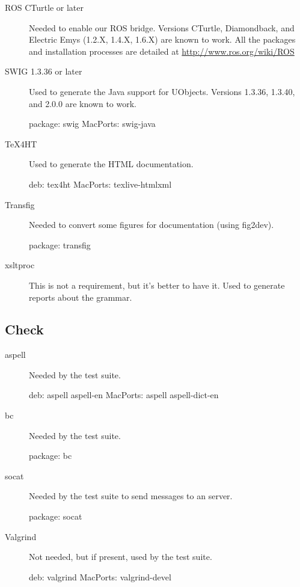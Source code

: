 \begin{description}
\item[ROS CTurtle or later] Needed to enable our ROS bridge.
  Versions CTurtle, Diamondback, and Electric Emys (1.2.X, 1.4.X, 1.6.X)
are known to work. All the packages and installation processes
are detailed at \url{http://www.ros.org/wiki/ROS}

\item[SWIG 1.3.36 or later] Used to generate the Java support for UObjects.
  Versions 1.3.36, 1.3.40, and 2.0.0 are known to work.
\begin{package}
package: swig
MacPorts: swig-java
\end{package}

\item[TeX4HT] Used to generate the HTML documentation.
\begin{package}
deb: tex4ht
MacPorts: texlive-htmlxml
\end{package}

\item[Transfig] Needed to convert some figures for documentation
  (using fig2dev).
\begin{package}
package: transfig
\end{package}

\item[xsltproc] This is not a requirement, but it's better to have it. Used
  to generate reports about the \us grammar.
\end{description}

\subsection{Check}

\begin{description}
\item[aspell] Needed by the test suite.
\begin{package}
deb: aspell aspell-en
MacPorts: aspell aspell-dict-en
\end{package}

\item[bc]
  Needed by the test suite.
\begin{package}
package: bc
\end{package}

\item[socat] Needed by the test suite to send messages to an \urbi server.
\begin{package}
package: socat
\end{package}

\item[Valgrind] Not needed, but if present, used by the test suite.
\begin{package}
deb: valgrind
MacPorts: valgrind-devel
\end{package}

\end{description}



